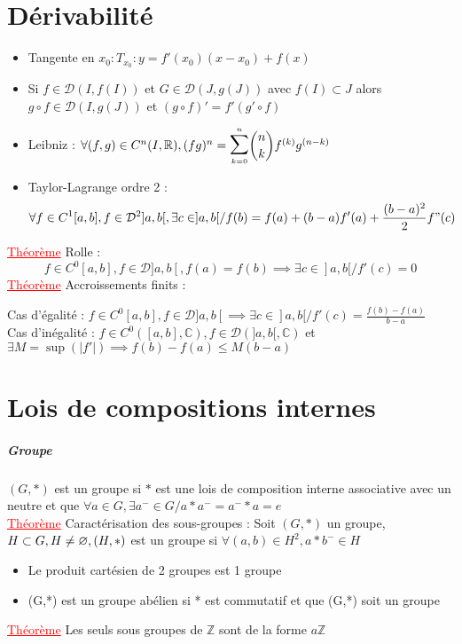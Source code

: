 \documentclass[a4paper, 11pts, french]{article}
\newcommand{\R}{\mathbb{R}}
\newcommand{\C}{\mathbb{C}}
\newcommand{\Z}{\mathbb{Z}}
\newcommand{\D}{\mathcal{D}}
\newcommand{\thm}{\textcolor{red}{\underline{Théorème} }}
\newcommand{\ssum}[2]{\vcenter{\hbox{\scaleto[4ex]{\displaystyle\sum_{\scriptscriptstyle #1}^{\scriptscriptstyle #2}}{7ex}}}}
\begin{document}
	\section{Dérivabilité}
	\begin{itemize}
	  \item Tangente en $x_0 : T_{x_0} : y=f'(x_0)(x-x_0)+f(x)$
	  \item Si $f \in \D(I,f(I))$ et $ G \in \D(J,g(J))$ avec $f(I) \subset J$ alors $g\circ f \in \D(I,g(J))$ et $(g\circ f)'=f'(g'\circ f)$
	  \item Leibniz : $\forall (f,g) \in C^n(I,\R), (fg)^n=\ssum{k=0}{n} \dbinom{n}{k} f^{(k)}g^{(n-k)}$
	  \item Taylor-Lagrange ordre 2 : $$\forall f \in C^1[a,b], f \in \D^2]a,b[, \exists c \in ]a,b[ / f(b)=f(a)+(b-a)f'(a)+\frac{(b-a)^2}{2}f"(c)$$
	\end{itemize}
	 \thm Rolle : \[f\in C^0[a,b], f \in \D]a,b[, f(a)=f(b) \implies \exists c \in ]a,b[ / f'(c)=0\]
	 \thm Accroissements finits : 
		\begin{center}
			Cas d'égalité : $f\in C^0[a,b], f \in \D]a,b[ \implies \exists c \in ]a,b[ / f'(c)=\frac{f(b)-f(a)}{b-a}$ \\
			Cas d'inégalité : $f\in C^0([a,b],\C), f \in \D(]a,b[,\C)$ et $\exists M=\sup(|f'|) \implies f(b)-f(a)\leqslant M(b-a)$
		\end{center}

	\section{Lois de compositions internes}
	\subparagraph{Groupe}
	$(G,*)$ est un groupe si $*$ est une lois de composition interne associative avec un neutre et que $\forall a \in G, \exists a^- \in G / a*a^-=a^-*a=e$ \\
	\thm Caractérisation des sous-groupes : Soit $(G,*)$ un groupe, $H \subset G, H \neq \varnothing, \\ (H,*)$ est un groupe si $\forall (a,b) \in H^2, a*b^- \in H$
	\begin{itemize}
	  \item Le produit cartésien de 2 groupes est 1 groupe
	  \item (G,*) est un groupe abélien si * est commutatif et que (G,*) soit un groupe
	\end{itemize}
	 \thm Les seuls sous groupes de $\Z$ sont de la forme $a\Z$
\end{document}
